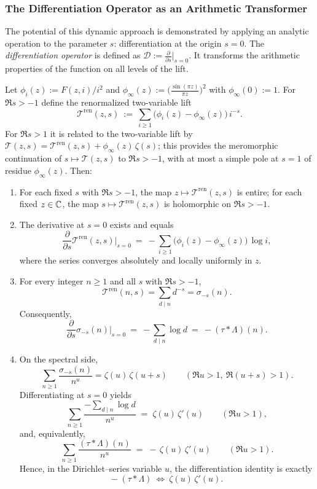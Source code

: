 \subsubsection{The Differentiation Operator as an Arithmetic Transformer}
The potential of this dynamic approach is demonstrated by applying an analytic operation to the parameter $s$: differentiation at the origin $s=0$. The \emph{differentiation operator} is defined as $\mathcal{D} := \frac{\partial}{\partial s}\big|_{s=0}$. It transforms the arithmetic properties of the function on all levels of the lift.

\begin{proposition}[Renormalized spectral differentiation at $s=0$]\label{prop:spectral-diff}
Let $\phi_i(z):=F(z,i)/i^2$ and $\phi_\infty(z):=\bigl(\frac{\sin(\pi z)}{\pi z}\bigr)^2$ with $\phi_\infty(0):=1$.
For $\Re s>-1$ define the renormalized two-variable lift
\[
\mathcal T^{\mathrm{ren}}(z,s)\ :=\ \sum_{i\ge1}\bigl(\phi_i(z)-\phi_\infty(z)\bigr)\,i^{-s}.
\]
For $\Re s>1$ it is related to the two-variable lift by $\mathcal T(z,s)=\mathcal T^{\mathrm{ren}}(z,s)+\phi_\infty(z)\,\zeta(s)$; this provides the meromorphic continuation of $s\mapsto\mathcal T(z,s)$ to $\Re s>-1$, with at most a simple pole at $s=1$ of residue $\phi_\infty(z)$.
Then:
\begin{enumerate}
\item For each fixed $s$ with $\Re s>-1$, the map $z\mapsto \mathcal T^{\mathrm{ren}}(z,s)$ is entire; for each fixed $z\in\mathbb{C}$, the map $s\mapsto \mathcal T^{\mathrm{ren}}(z,s)$ is holomorphic on $\Re s>-1$.
\item The derivative at $s=0$ exists and equals
\[
\frac{\partial}{\partial s}\mathcal T^{\mathrm{ren}}(z,s)\Big|_{s=0}
\ =\ -\sum_{i\ge1}\bigl(\phi_i(z)-\phi_\infty(z)\bigr)\,\log i,
\]
where the series converges absolutely and locally uniformly in $z$.
\item For every integer $n\ge1$ and all $s$ with $\Re s>-1$,
\[
\mathcal T^{\mathrm{ren}}(n,s)=\sum_{d\mid n}d^{-s}=\sigma_{-s}(n).
\]
Consequently,
\[
\frac{\partial}{\partial s}\sigma_{-s}(n)\Big|_{s=0}\ =\ -\sum_{d\mid n}\log d\ =\ -(\tau*\Lambda)(n).
\]
\item On the spectral side,
\[
\sum_{n\ge1}\frac{\sigma_{-s}(n)}{n^{u}}=\zeta(u)\,\zeta(u+s)\qquad(\Re u>1,\ \Re(u+s)>1).
\]
Differentiating at $s=0$ yields
\[
\sum_{n\ge1}\frac{-\sum_{d\mid n}\log d}{n^u}\;=\;\zeta(u)\,\zeta'(u)\qquad(\Re u>1),
\]
and, equivalently,
\[
\sum_{n\ge1}\frac{(\tau*\Lambda)(n)}{n^u}\;=\;-\,\zeta(u)\,\zeta'(u)\qquad(\Re u>1).
\]
Hence, in the Dirichlet–series variable $u$, the differentiation identity is exactly
\[
-\;(\tau*\Lambda)\ \Longleftrightarrow\ \zeta(u)\,\zeta'(u).
\]
\end{enumerate}
\end{proposition}

